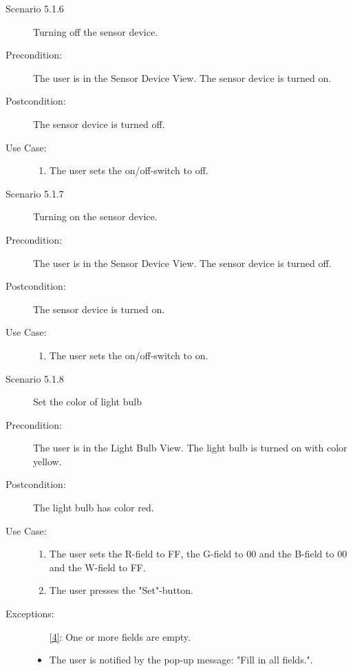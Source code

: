 \documentclass[a4paper]{article}
\begin{document}
\begin{description}
\item[]

\item[Scenario 5.1.6] Turning off the sensor device.
\item[Precondition:] The user is in the Sensor Device View. The sensor device is turned on.
\item[Postcondition:] The sensor device is turned off.
\item[Use Case:]\mbox{}
\begin{enumerate}
\item  The user sets the on/off-switch to off.
\end{enumerate}

\item[]

\item[Scenario 5.1.7] Turning on the sensor device.
\item[Precondition:] The user is in the Sensor Device View. The sensor device is turned off.
\item[Postcondition:] The sensor device is turned on.
\item[Use Case:]\mbox{}
\begin{enumerate}
\item  The user sets the on/off-switch to on.
\end{enumerate}

\item[]

\item[Scenario 5.1.8] Set the color of light bulb
\item[Precondition:] The user is in the Light Bulb View. The light bulb is turned on with color yellow.
\item[Postcondition:] The light bulb has color red.
\item[Use Case:]\mbox{}
\begin{enumerate}
\item  \label{4} The user sets the R-field to FF, the G-field to 00 and the B-field to 00 and the W-field to FF.
\item The user presses the "Set"-button.

\end{enumerate}

\item[Exceptions:]
\item[]

\begin{itemize}
\item [\ref{4}:] One or more fields are empty.
\item The user is notified by the pop-up message: "Fill in all fields.".
\end{itemize}


\end{description}
\end{document}
